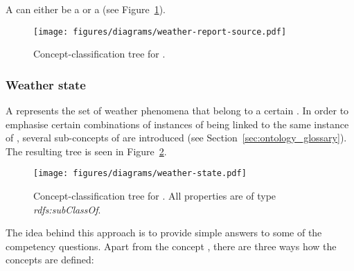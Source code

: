 A  can either be a  or a  (see Figure~\ref{fig:tree_weather_source}).

\begin{figure}
  \centering
  \texttt{[image: figures/diagrams/weather-report-source.pdf]}
  \caption[Concept-classification tree for ]{Concept-classification tree for .}
  \label{fig:tree_weather_source}
\end{figure}

\subsubsection{Weather state}

A  represents the set of weather phenomena that belong to a certain . In order to emphasise certain combinations of instances of  being linked to the same instance of , several sub-concepts of  are introduced (see Section~\ref{sec:ontology_glossary}). The resulting tree is seen in Figure~\ref{fig:tree_weather_state}.

\begin{figure}
  \centering
  \texttt{[image: figures/diagrams/weather-state.pdf]}
  \caption[Concept-classification tree for ]{Concept-classification tree for . All properties are of type \emph{rdfs:subClassOf}.}
  \label{fig:tree_weather_state}
\end{figure}

The idea behind this approach is to provide simple answers to some of the competency questions. Apart from the concept , there are three ways how the concepts are defined:

